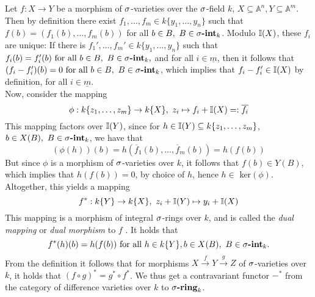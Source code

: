 \begin{rem}\label{dualmor}
Let $f: X \rightarrow Y$ be a morphism of $\sigma$-varieties over the $\sigma$-field $k$, $X \subseteq \mathbb{A}^n, Y \subseteq \mathbb{A}^m$. Then by definition there exist $f_1, \ldots, f_m \in k\{y_1,\ldots,y_n\}$ such 
that $f(b) = (f_1(b),\ldots,f_m(b))$ for all $b \in B, ~ B \in \sigma\text{{\normalfont\textbf{-int}}}_k$. Modulo $\mathbb{I}(X)$, these $f_i$ are unique:
 If there is $f_1', \ldots, f_m' \in k\{y_1,\ldots,y_n\}$ such that $f_i(b) = f'_i(b) \text{ for all } b \in B, ~ B \in \sigma\text{{\normalfont\textbf{-int}}}_k,$ and for all $i \in \underline{m}$,
then it follows that $(f_i - f_i')(b) = 0 \text{ for all } b \in B, ~ B \in \sigma\text{{\normalfont\textbf{-int}}}_k$, which implies that $f_i - f_i' \in \mathbb{I}(X)$ by definition, for all $i \in \underline{m}$. \\
\indent Now, consider the mapping \[ \phi: k\{z_1,\ldots,z_m \} \rightarrow k\{X\}, ~ z_i \mapsto f_i + \mathbb{I}(X) =: \overline{f_i} \]
This mapping factors over $\mathbb{I}(Y)$, since for $h \in \mathbb{I}(Y) \subseteq k\{z_1,\ldots,z_m\}$, $b \in X(B), ~ B \in \sigma\text{{\normalfont\textbf{-int}}}_k$, we have that 
\[ (\phi(h))(b) = h(\overline f_1(b), \ldots, \overline f_m(b)) = h(f(b)) \]
But since $\phi$ is a morphism of $\sigma$-varieties over $k$, it follows that $f(b) \in Y(B)$, which implies that $h(f(b)) = 0$, by choice of $h$, hence $h \in $ ker$(\phi)$.
Altogether, this yields a mapping 
\[ f^* : k\{Y\} \rightarrow k\{X\}, ~ z_i + \mathbb{I}(Y) \mapsto y_i + \mathbb{I}(X) \]
This mapping is a morphism of integral $\sigma$-rings over $k$, and is called the \emph{dual mapping} or \emph{dual morphism} to $f$ . It holds that
\[ f^*(h)(b) = h(f(b)) \text{ for all } h \in k\{Y\}, b \in X(B), ~ B \in \sigma\text{{\normalfont\textbf{-int}}}_k. \]
From the definition it follows that for morphisms $X \xrightarrow{f} Y \xrightarrow{g} Z$ of $\sigma$-varieties over $k$, it holds that $ (f \circ g)^* = g^* \circ f^*$. 
We thus get a contravariant functor $-^*$ from the category of difference varieties over $k$ to $\sigma\text{{\normalfont\textbf{-ring}}}_k$.
\end{rem}

